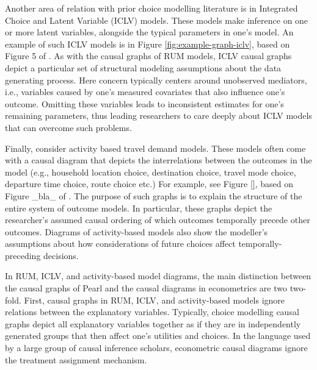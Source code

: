 Another area of relation with prior choice modelling literature is in Integrated Choice and Latent Variable (ICLV) models.
These models make inference on one or more latent variables, alongside the typical parameters in one's model.
An example of such ICLV models is in Figure \ref{fig:example-graph-iclv}, based on Figure 5 of \citet{ben_2002_integration}.
As with the causal graphs of RUM models, ICLV causal graphs depict a particular set of structural modeling assumptions about the data generating process.
Here concern typically centers around unobserved mediators, i.e., variables caused by one's measured covariates that also influence one's outcome.
Omitting these variables leads to inconsistent estimates for one's remaining parameters, thus leading researchers to care deeply about ICLV models that can overcome such problems.


Finally, consider activity based travel demand models.
These models often come with a causal diagram that depicts the interrelations between the outcomes in the model (e.g., household location choice, destination choice, travel mode choice, departure time choice, route choice etc.)
For example, see Figure \ref{}, based on Figure \_bla\_ of \citet{bradley_2010_sacsim}.
The purpose of such graphs is to explain the structure of the entire system of outcome models.
In particular, these graphs depict the researcher's assumed causal ordering of which outcomes temporally precede other outcomes.
Diagrams of activity-based models also show the modeller's assumptions about how considerations of future choices affect temporally-preceding decisions.

In RUM, ICLV, and activity-based model diagrams, the main distinction between the causal graphs of Pearl \citet{article_name} and the causal diagrams in econometrics are two two-fold.
First, causal graphs in RUM, ICLV, and activity-based models ignore relations between the explanatory variables.
Typically, choice modelling causal graphs depict all explanatory variables together as if they are in independently generated groups that then affect one's utilities and choices.
In the language used by a large group of causal inference scholars, econometric causal diagrams ignore the treatment assignment mechanism.

